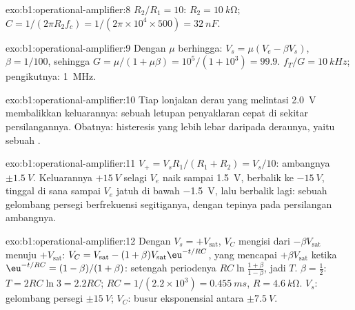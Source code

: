 \begin{solution}{exo:b1:operational-amplifier:8}
$R_2/R_1 = 10$: $R_2 = \qty{10}{k\ohm}$; $C = 1/(2\pi R_2f_c) = 1/(2\pi
\times 10^4 \times 500) = \qty{32}{nF}$.
\end{solution}

\begin{solution}{exo:b1:operational-amplifier:9}
Dengan $\mu$ berhingga: $V_s = \mu(V_e - \beta V_s)$, $\beta = 1/100$, sehingga
$G = \mu/(1 + \mu\beta) = 10^5/(1 + 10^3) = 99.9$.  $f_T/G =
\qty{10}{kHz}$; pengikutnya: \qty{1}{MHz}.
\end{solution}

\begin{solution}{exo:b1:operational-amplifier:10}
Tiap lonjakan derau yang melintasi \qty{2.0}{V} membalikkan
keluarannya: sebuah letupan penyaklaran cepat di sekitar
persilangannya. Obatnya: histeresis yang lebih lebar daripada deraunya,
yaitu sebuah .
\end{solution}

\begin{solution}{exo:b1:operational-amplifier:11}
$V_+ = V_sR_1/(R_1 + R_2) = V_s/10$: ambangnya $\pm\qty{1.5}{V}$.
Keluarannya $+\qty{15}{V}$ selagi $V_e$ naik sampai \qty{1.5}{V},
berbalik ke $-\qty{15}{V}$, tinggal di sana sampai $V_e$ jatuh di bawah
\qty{-1.5}{V}, lalu berbalik lagi: sebuah gelombang persegi berfrekuensi
segitiganya, dengan tepinya pada persilangan ambangnya.
\end{solution}

\begin{solution}{exo:b1:operational-amplifier:12}
Dengan $V_s = +V_{\mathrm{sat}}$, $V_C$ mengisi dari $-\beta V_{\mathrm{sat}}$
menuju $+V_{\mathrm{sat}}$: $V_C = V_{\mathrm{sat}} - (1 + \beta)V_{\mathrm{sat}}
\eu^{-t/RC}$, yang mencapai $+\beta V_{\mathrm{sat}}$ ketika $\eu^{-t/RC} =
(1 - \beta)/(1 + \beta)$: setengah periodenya $RC\ln\frac{1 + \beta}{1 - \beta}$,
jadi $T$. $\beta = \tfrac12$: $T = 2RC\ln 3 = 2.2RC$; $RC = 1/(2.2 \times
10^3) = \qty{0.455}{ms}$, $R = \qty{4.6}{k\ohm}$. $V_s$: gelombang persegi
$\pm\qty{15}{V}$; $V_C$: busur eksponensial antara $\pm\qty{7.5}{V}$.
\end{solution}

